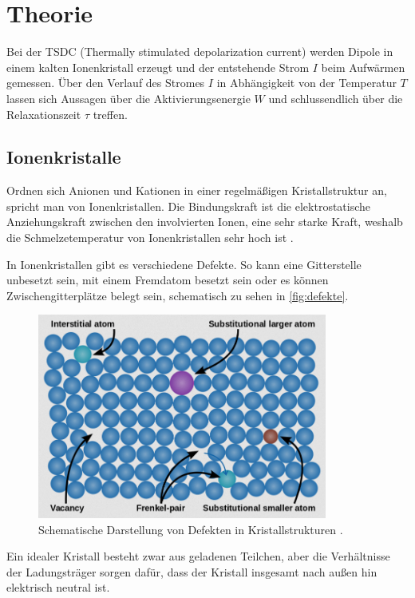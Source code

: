 \section{Theorie}
\label{sec:Theorie}

Bei der TSDC (Thermally stimulated depolarization current) werden Dipole in einem kalten Ionenkristall erzeugt
und der entstehende Strom $I$ beim Aufwärmen gemessen. Über den Verlauf des Stromes $I$ in Abhängigkeit von der Temperatur $T$
 lassen sich Aussagen über die Aktivierungsenergie $W$ und schlussendlich über die Relaxationszeit $\tau$ treffen.

\subsection{Ionenkristalle}
Ordnen sich Anionen und Kationen in einer regelmäßigen Kristallstruktur an, spricht man von Ionenkristallen.
Die Bindungskraft ist die elektrostatische Anziehungskraft zwischen den involvierten Ionen, eine sehr starke Kraft, weshalb die Schmelzetemperatur 
von Ionenkristallen sehr hoch ist \cite{schmelzpunkt}.

In Ionenkristallen gibt es verschiedene Defekte. So kann eine Gitterstelle unbesetzt sein, mit einem Fremdatom besetzt sein oder es können Zwischengitterplätze belegt sein, schematisch zu sehen in
\autoref{fig:defekte}.

\begin{figure}[H]
    \centering
    \includegraphics[width=0.85\textwidth]{Bilder/bildd.png}
    \caption{Schematische Darstellung von Defekten in Kristallstrukturen \cite{bild}.}
    \label{fig:defekte}
\end{figure}

Ein idealer Kristall besteht zwar aus geladenen Teilchen, aber die Verhältnisse der Ladungsträger sorgen dafür, dass der Kristall
insgesamt nach außen hin elektrisch neutral ist.

